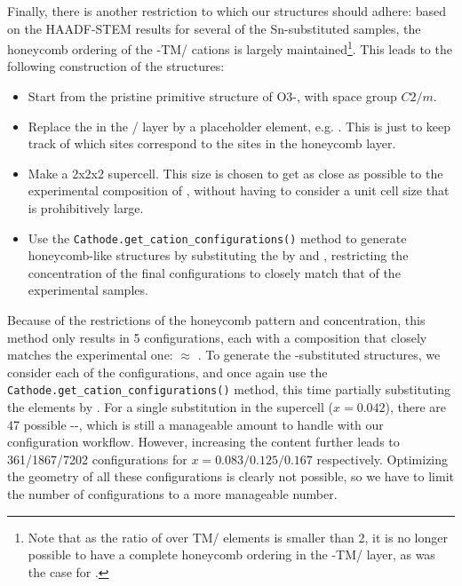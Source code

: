 \begin{refsection}
Finally, there is another restriction to which our structures should adhere: based on the HAADF-STEM results for several of the Sn-substituted samples, the honeycomb ordering of the -TM/ cations is largely maintained\footnote{Note that as the ratio of  over TM/ elements is smaller than 2, it is no longer possible to have a complete honeycomb ordering in the  -TM/ layer, as was the case for .}. This leads to the following construction of the  structures: 
\begin{itemize}
\item Start from the pristine primitive structure of O3-, with space group $C2/m$.
\item Replace the  in the / layer by a placeholder element, e.g. . This is just to keep track of which sites correspond to the  sites in the honeycomb layer.
\item Make a 2x2x2 supercell. This size is chosen to get as close as possible to the experimental composition of , without having to consider a unit cell size that is prohibitively large.
\item Use the \texttt{Cathode.get\_cation\_configurations()} method to generate honeycomb-like structures by substituting the  by  and , restricting the  concentration of the final configurations to closely match that of the experimental samples.
\end{itemize}
Because of the restrictions of the honeycomb pattern and  concentration, this method only results in 5 configurations, each with a composition that closely matches the experimental one:  $\approx$ . To generate the -substituted structures, we consider each of the  configurations, and once again use the \texttt{Cathode.get\_cation\_configurations()} method, this time partially substituting the  elements by . For a single  substitution in the supercell ($x = 0.042$), there are 47 possible --, which is still a manageable amount to handle with our configuration workflow. However, increasing the  content further leads to 361/1867/7202 configurations for $x = 0.083/0.125/0.167$ respectively. Optimizing the geometry of all these configurations is clearly not possible, so we have to limit the number of configurations to a more manageable number. 


\end{refsection}
